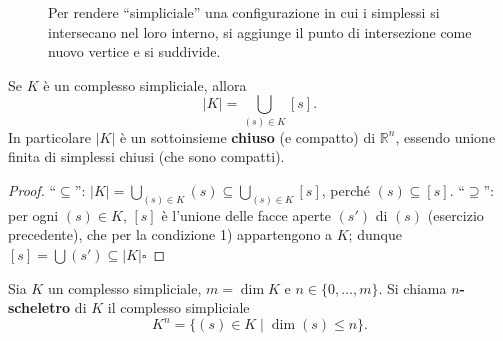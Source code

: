 \begin{figure}[H]
    \centering
    \caption{Per rendere ``simpliciale'' una configurazione in cui i simplessi si intersecano nel loro interno, si aggiunge il punto di intersezione come nuovo vertice e si suddivide.}
\end{figure}

\begin{prop}
Se $K$ \`e un complesso simpliciale, allora
\[
|K| = \bigcup_{(s) \in K} [s].
\]
In particolare $|K|$ \`e un sottoinsieme \textbf{chiuso} (e compatto) di $\mathbb{R}^n$, essendo unione finita di simplessi chiusi (che sono compatti).
\end{prop}
\begin{proof}
``$\subseteq$'': $|K| = \bigcup_{(s) \in K} (s) \subseteq \bigcup_{(s) \in K} [s]$, perch\'e $(s) \subseteq [s]$.
``$\supseteq$'': per ogni $(s) \in K$, $[s]$ \`e l'unione delle facce aperte $(s')$ di $(s)$ (esercizio precedente), che per la condizione 1) appartengono a $K$; dunque $[s] = \bigcup (s') \subseteq |K|$\hfill$\square$
\end{proof}

\begin{definicion}[$n$-scheletro]
Sia $K$ un complesso simpliciale, $m = \dim K$ e $n \in \{0, \dots, m\}$. Si chiama \textbf{$n$-scheletro} di $K$ il complesso simpliciale
\[
K^n = \{ (s) \in K \mid \dim (s) \leqslant n \}.
\]
\end{definicion}

